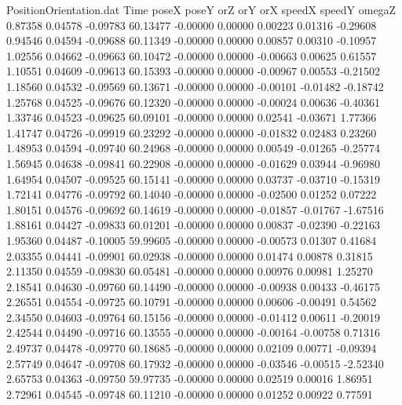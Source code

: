 \begin{filecontents}{PositionOrientation.dat}
Time poseX poseY orZ orY orX speedX speedY omegaZ
   0.87358    0.04578   -0.09783    60.13477   -0.00000    0.00000    0.00223    0.01316   -0.29608
   0.94546    0.04594   -0.09688    60.11349   -0.00000    0.00000    0.00857    0.00310   -0.10957
   1.02556    0.04662   -0.09663    60.10472   -0.00000    0.00000   -0.00663    0.00625    0.61557
   1.10551    0.04609   -0.09613    60.15393   -0.00000    0.00000   -0.00967    0.00553   -0.21502
   1.18560    0.04532   -0.09569    60.13671   -0.00000    0.00000   -0.00101   -0.01482   -0.18742
   1.25768    0.04525   -0.09676    60.12320   -0.00000    0.00000   -0.00024    0.00636   -0.40361
   1.33746    0.04523   -0.09625    60.09101   -0.00000    0.00000    0.02541   -0.03671    1.77366
   1.41747    0.04726   -0.09919    60.23292   -0.00000    0.00000   -0.01832    0.02483    0.23260
   1.48953    0.04594   -0.09740    60.24968   -0.00000    0.00000    0.00549   -0.01265   -0.25774
   1.56945    0.04638   -0.09841    60.22908   -0.00000    0.00000   -0.01629    0.03944   -0.96980
   1.64954    0.04507   -0.09525    60.15141   -0.00000    0.00000    0.03737   -0.03710   -0.15319
   1.72141    0.04776   -0.09792    60.14040   -0.00000    0.00000   -0.02500    0.01252    0.07222
   1.80151    0.04576   -0.09692    60.14619   -0.00000    0.00000   -0.01857   -0.01767   -1.67516
   1.88161    0.04427   -0.09833    60.01201   -0.00000    0.00000    0.00837   -0.02390   -0.22163
   1.95360    0.04487   -0.10005    59.99605   -0.00000    0.00000   -0.00573    0.01307    0.41684
   2.03355    0.04441   -0.09901    60.02938   -0.00000    0.00000    0.01474    0.00878    0.31815
   2.11350    0.04559   -0.09830    60.05481   -0.00000    0.00000    0.00976    0.00981    1.25270
   2.18541    0.04630   -0.09760    60.14490   -0.00000    0.00000   -0.00938    0.00433   -0.46175
   2.26551    0.04554   -0.09725    60.10791   -0.00000    0.00000    0.00606   -0.00491    0.54562
   2.34550    0.04603   -0.09764    60.15156   -0.00000    0.00000   -0.01412    0.00611   -0.20019
   2.42544    0.04490   -0.09716    60.13555   -0.00000    0.00000   -0.00164   -0.00758    0.71316
   2.49737    0.04478   -0.09770    60.18685   -0.00000    0.00000    0.02109    0.00771   -0.09394
   2.57749    0.04647   -0.09708    60.17932   -0.00000    0.00000   -0.03546   -0.00515   -2.52340
   2.65753    0.04363   -0.09750    59.97735   -0.00000    0.00000    0.02519    0.00016    1.86951
   2.72961    0.04545   -0.09748    60.11210   -0.00000    0.00000    0.01252    0.00922    0.77591

\end{filecontents}
